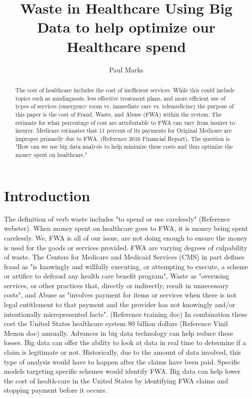 \documentclass[sigconf]{acmart}
\begin{document}
\title{Waste in Healthcare
Using Big Data to help optimize our Healthcare spend}


\author{Paul Marks}


\begin{abstract}
The cost of healthcare includes the cost of inefficient services.  While this could include topics such as misdiagnosis, less effective treatment plans, and more efficient use of types of services (emergency room vs. immediate care vs. telemedicine) the purpose of this paper is the cost of Fraud, Waste, and Abuse (FWA) within the system.  The estimate for what percentage of cost are attributable to FWA can vary from insurer to insurer.  Medicare estimates that 11 percent of its payments for Original Medicare are improper primarily due to FWA.  (Reference 2016 Financial Report).   The question is "How can we use big data analysis to help minimize these costs and thus optimize the money spent on healthcare."
\end{abstract}



\maketitle

\section{Introduction}

The definition of verb waste includes "to spend or use carelessly" (Reference webster).  When money spent on healthcare goes to FWA, it is money being spent carelessly.  We, FWA is all of our issue, are not doing enough to ensure the money is used for the goods or services provided.  FWA are varying degrees of culpability of waste.  The Centers for Medicare and Medicaid Services (CMS) in part defines fraud as "is knowingly and willfully executing, or attempting to execute, a scheme or artifice to defraud any health care benefit program", Waste as "overusing services, or other practices that, directly or indirectly, result in unnecessary costs", and Abuse as "involves payment for items or services when there is not legal entitlement to that payment and the provider has not knowingly and/or intentionally misrepresented facts".  (Reference training doc)  In combination these cost the United States healthcare system 80 billion dollars (Reference Vinil Menon doc) annually.  
Advances in big data technology can help reduce these losses.  Big data can offer the ability to look at data in real time to determine if a claim is legitimate or not.  Historically, due to the amount of data involved, this type of analysis would have to happen after the claims have been paid.  Specific models targeting specific schemes would identify FWA.  Big data can help lower the cost of health-care in the United States by identifying FWA claims and stopping payment before it occurs. 
\end{document}
